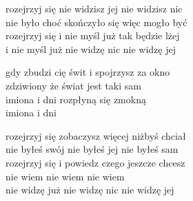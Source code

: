 \begin{text}
    rozejrzyj się nie widzisz jej nie widzisz nic\\
    nie było choć skończyło się więc mogło być\\
    rozejrzyj się i nie myśl już tak będzie lżej\\
    i nie myśl już nie widzę nic nie widzę jej

    gdy zbudzi cię świt i spojrzysz za okno\\
    zdziwiony że świat jest taki sam\\
    imiona i dni rozpłyną się zmokną\\
    imiona i dni

    rozejrzyj się zobaczysz więcej niżbyś chciał\\
    nie byłeś swój nie byłeś jej nie byłeś sam\\
    rozejrzyj się i powiedz czego jeszcze chcesz\\
    nie wiem nie wiem nie wiem\\
    nie widzę już nie widzę nic nie widzę jej
\end{text}
\begin{chord}

\end{chord}